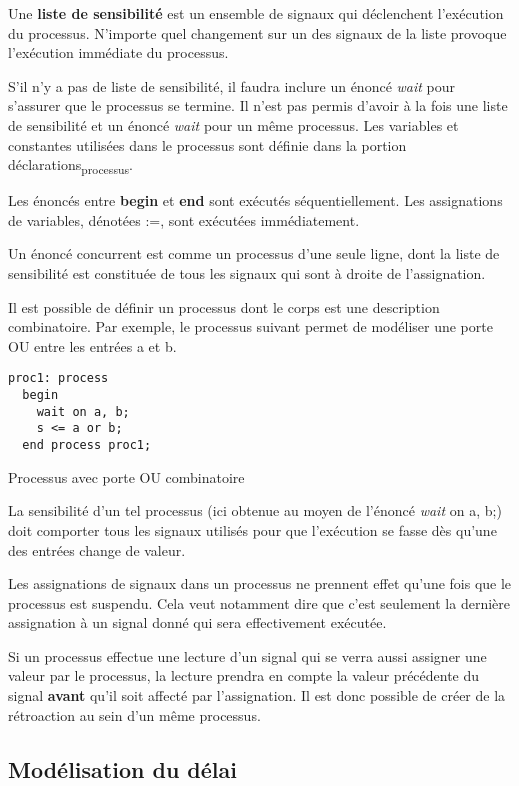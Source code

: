 \documentclass[11pt]{article}
\begin{document}
Une \textbf{liste de sensibilité} est un ensemble de signaux qui déclenchent
l'exécution du processus. N'importe quel changement sur un des signaux
de la liste provoque l'exécution immédiate du processus.

S'il n'y a pas de liste de sensibilité, il faudra inclure un énoncé
\emph{wait} pour s'assurer que le processus se termine. Il n'est pas permis
d'avoir à la fois une liste de sensibilité et un énoncé \emph{wait} pour un
même processus. Les variables et constantes utilisées dans le
processus sont définie dans la portion déclarations\textsubscript{processus}. 

Les énoncés entre \textbf{begin} et \textbf{end} sont exécutés séquentiellement. Les
assignations de variables, dénotées :=, sont exécutées immédiatement. 

Un énoncé concurrent est comme un processus d'une seule ligne, dont la
liste de sensibilité est constituée de tous les signaux qui sont à
droite de l'assignation.

Il est possible de définir un processus dont le corps est une
description combinatoire. Par exemple, le processus suivant permet de
modéliser une porte OU entre les entrées a et b. 

\begin{listing}[htbp]
\begin{verbatim}
proc1: process
  begin
    wait on a, b;
    s <= a or b;
  end process proc1;
\end{verbatim}
\caption{Processus avec porte OU combinatoire}
\end{listing}

La sensibilité d'un tel processus (ici obtenue au moyen de l'énoncé
\emph{wait} on a, b;) doit comporter tous les signaux utilisés pour que
l'exécution se fasse dès qu'une des entrées change de valeur.

Les assignations de signaux dans un processus ne prennent effet qu'une
fois que le processus est suspendu. Cela veut notamment dire que c'est
seulement la dernière assignation à un signal donné qui sera
effectivement exécutée.

Si un processus effectue une lecture d'un signal qui se verra aussi
assigner une valeur par le processus, la lecture prendra en compte la
valeur précédente du signal \textbf{avant} qu'il soit affecté par
l'assignation. Il est donc possible de créer de la rétroaction au sein
d'un même processus.

\subsection{Modélisation du délai}
\label{sec:org0c3c97c}
\end{document}
